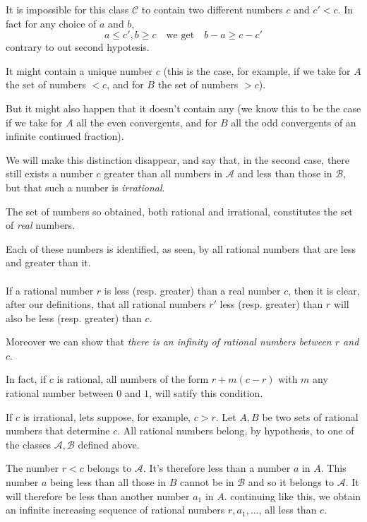 \documentclass[10pt,letterpaper]{book}
\theoremstyle{definition}
\begin{document}
It is impossible for this class $\mathcal C$ to contain two different numbers $c$ and $c' < c$. In fact for any choice of $a$ and $b$,
\[
  a\leq c', b\geq c\quad\mbox{we get}\quad b-a\geq c-c'
\]
contrary to out second hypotesis.

It might contain a unique number $c$ (this is the case, for example, if we take for $A$ the set of numbers $< c$, and for $B$ the set of numbers $> c$).

But it might also happen that it doesn't contain any (we know this to be the case if we take for $A$ all the even convergents, and for $B$ all the odd convergents of an infinite continued fraction).

We will make this distinction disappear, and say that, in the second case, there still exists a number $c$ greater than all numbers in $\mathcal A$ and less than those in $\mathcal B$, but that such a number is \textit{irrational}.

The set of numbers so obtained, both rational and irrational, constitutes the set of \textit{real} numbers.


Each of these numbers is identified, as seen, by all rational numbers that are less and greater than it.

\paragraph{} If a rational number $r$ is less (resp. greater) than a real number $c$, then it is clear, after our definitions, that all rational numbers $r'$ less (resp. greater) than $r$ will also be less (resp. greater) than $c$.

Moreover we can show that \textit{there is an infinity of rational numbers between $r$ and $c$}.

In fact, if $c$ is rational, all numbers of the form $r+m(c-r)$ with $m$ any rational number between $0$ and $1$, will satify this condition.

If $c$ is irrational, lets suppose, for example, $c > r$. Let $A, B$ be two sets of rational numbers that determine $c$. All rational numbers belong, by hypothesis, to one of the classes $\mathcal A, \mathcal B$ defined above.

The number $r < c$ belongs to $\mathcal A$. It's therefore less than a number $a$ in $A$. This number $a$ being less than all those in $B$ cannot be in $\mathcal B$ and so it belongs to $\mathcal A$. It will therefore be less than another number $a_1$ in $A$. continuing like this, we obtain an infinite increasing sequence of rational numbers $r, a_1, \dots$, all less than $c$.
\end{document}
